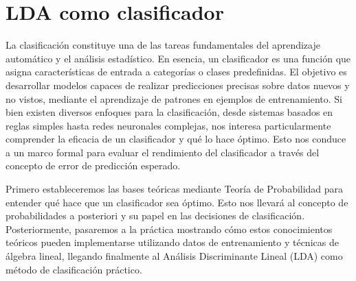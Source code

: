 \section{LDA como clasificador}

La clasificación constituye una de las tareas fundamentales del aprendizaje automático y el análisis estadístico. En esencia, un clasificador es una función que asigna características de entrada a categorías o clases predefinidas. El objetivo es desarrollar modelos capaces de realizar predicciones precisas sobre datos nuevos y no vistos, mediante el aprendizaje de patrones en ejemplos de entrenamiento. Si bien existen diversos enfoques para la clasificación, desde sistemas basados en reglas simples hasta redes neuronales complejas, nos interesa particularmente comprender la eficacia de un clasificador y qué lo hace óptimo. Esto nos conduce a un marco formal para evaluar el rendimiento del clasificador a través del concepto de error de predicción esperado.

Primero estableceremos las bases teóricas mediante Teoría de Probabilidad para entender qué hace que un clasificador sea óptimo. Esto nos llevará al concepto de probabilidades a posteriori y su papel en las decisiones de clasificación. Posteriormente, pasaremos a la práctica mostrando cómo estos conocimientos teóricos pueden implementarse utilizando datos de entrenamiento y técnicas de álgebra lineal, llegando finalmente al Análisis Discriminante Lineal (LDA) como método de clasificación práctico.
